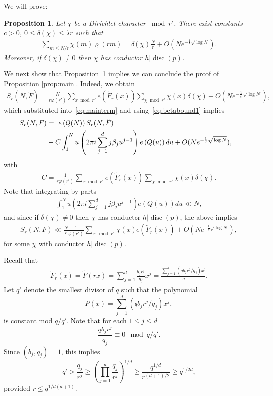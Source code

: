 \documentclass[12pt]{amsart}
\newtheorem{prop}{Proposition}
\def\\{\cr}
\def\le{\leqslant}
\def\ge{\geqslant}
\begin{document}
We will prove: 

\begin{prop}
\label{prop:dirich}
Let $\chi$ be a Dirichlet character $\bmod{r'}$. There exist constants $c>0$, $0\le \delta(\chi) \le \lambda r $ such that
\begin{align*}
\sum_{m\le N/r} \chi(m)\varrho(rm) = \delta(\chi) \frac{N}{r} + O(Ne^{-\frac{1}{c} \sqrt{\log{N}}}).
\end{align*}
Moreover, if $\delta(\chi) \ne 0$ then $\chi$ has conductor  $h| \operatorname{disc}(p)$.
\end{prop}
We next show that Proposition~\ref{prop:dirich} implies we can conclude the proof of Proposition \ref{prop:main}. Indeed,  we obtain
\begin{align*}
S_r(N, \tilde{F}) = \frac{N}{r\varphi(r')}\sum_{x\bmod{r'}} e(\tilde{F}_r(x))  \sum_{ \chi \bmod{r'}} \overline{\chi(x)} \delta(\chi)  + O(N e^{-\frac{1}{c'}\sqrt{\log{N}}}),
\end{align*}
which substituted into~\eqref{eq:mainterm} and using~\eqref{eq:betabound1} implies 
\begin{align*}
S_r(N, F) &= \ e\left(  Q(N) \right)  S_r(N, \tilde{F}) \\&-  C\int_{1}^N u\left( 2\pi i \sum_{j=1}^d j\beta_j u^{j-1}\right) e\left( Q(u) \right)du+ O(N e^{-\frac{1}{c}\sqrt{\log{N}}}),
\end{align*}
with 
\begin{align*}
C= \frac{1}{r\varphi(r')}\sum_{x\bmod{r'}} e(\tilde{F}_r(x))  \sum_{ \chi \bmod{r'}} \overline{\chi(x)} \delta(\chi). 
\end{align*}
Note that integrating by parts
\begin{align*}
\int_{1}^N u\left( 2\pi i \sum_{j=1}^d j\beta_j u^{j-1}\right) e\left( Q(u) \right)du\ll N,
\end{align*}
and since  if $\delta(\chi) \ne 0$ then $\chi$ has conductor  $h| \operatorname{disc}(p)$, the above implies 
\begin{align}
\label{eq:SrFFNFNF}
S_r(N,F)\ll \frac{N}{r}\frac{1}{\phi(r')}\sum_{x\mod{r'}}\chi(x)e(\tilde F_r(x))+O(N e^{-\frac{1}{c}\sqrt{\log{N}}}),
\end{align}
for some $\chi$ with conductor  $h| \operatorname{disc}(p)$. 

Recall that 
\begin{align*}
\tilde F_r(x)=\tilde F(rx)=\sum_{j=1}^{d}\frac{b_jr^{j}}{q_j}x^{j}=\frac{\sum_{j=1}^{d}(qb_j r^{j}/q_j)x^{j}}{q}.
\end{align*}
Let $q'$ denote the smallest divisor of $q$ such that the polynomial 
$$P(x)=\sum_{j=1}^{d}(qb_j r^{j}/q_j)x^{j},$$ 
is constant mod $q/q'$. Note that for each $1\le j\le d$
$$\frac{q b_jr^{j}}{q_j}\equiv 0 \mod{q/q'}.$$
Since $(b_j,q_j)=1$, this implies 
$$q'> \frac{q_j}{r^{j}}\ge \left(\prod_{j=1}^{d}\frac{q_j}{r^{j}}\right)^{1/d}\ge \frac{q^{1/d}}{r^{(d+1)/2}}\ge q^{1/2d},$$
provided $r\le q^{1/d(d+1)}.$
\end{document}
